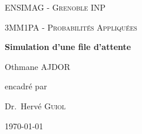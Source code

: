 \documentclass[12pt,a4paper]{article}
\begin{document}
    \begin{titlepage}
        \centering
        {\scshape\LARGE ENSIMAG - Grenoble INP \par}
        \vspace{1cm}
        {\scshape\Large 3MM1PA - Probabilités Appliquées\par}
        \vspace{1.5cm}
        {\huge\bfseries Simulation d'une file d'attente\par}
        \vspace{2cm}
        {\Large Othmane AJDOR\par}
        \vfill
        encadré par\par
        Dr.~Hervé \textsc{Guiol}
    
        \vfill
    
    
        {\large \today\par}
    \end{titlepage}
    
    \tableofcontents
    
\end{document}
